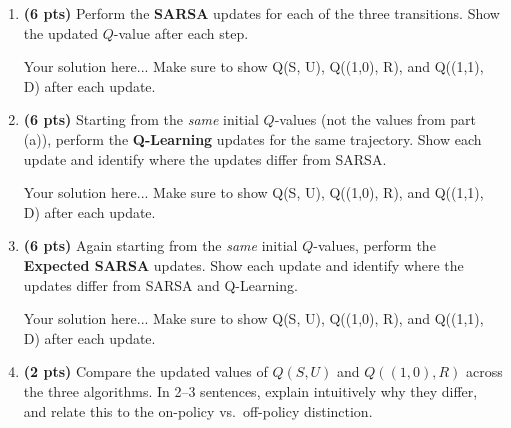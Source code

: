 \documentclass[12pt]{article}
\begin{document}
\begin{enumerate}[label=\textbf{(\alph*)}, itemsep=12pt]

\item \textbf{(6 pts)} Perform the \textbf{SARSA} updates for each of the three transitions. Show the updated $Q$-value after each step.

\begin{solution}
    Your solution here... Make sure to show Q(S, U), Q((1,0), R), and Q((1,1), D) after each update.
\end{solution}

\item \textbf{(6 pts)} Starting from the \emph{same} initial $Q$-values (not the values from part (a)), perform the \textbf{Q-Learning} updates for the same trajectory. Show each update and identify where the updates differ from SARSA.

\begin{solution}
    Your solution here... Make sure to show Q(S, U), Q((1,0), R), and Q((1,1), D) after each update.
\end{solution}

\item \textbf{(6 pts)} Again starting from the \emph{same} initial $Q$-values, perform the \textbf{Expected SARSA} updates. Show each update and identify where the updates differ from SARSA and Q-Learning.

\begin{solution}
    Your solution here... Make sure to show Q(S, U), Q((1,0), R), and Q((1,1), D) after each update.
\end{solution}

\item \textbf{(2 pts)} Compare the updated values of $Q(S,U)$ and $Q((1,0), R)$ across the three algorithms. In 2--3 sentences, explain intuitively why they differ, and relate this to the on-policy vs.\ off-policy distinction.

\end{enumerate}
\end{document}
